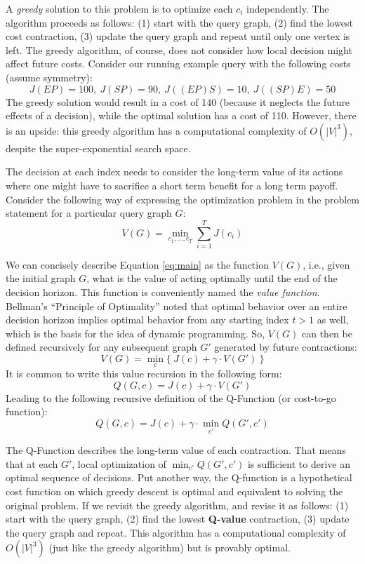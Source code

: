A \emph{greedy} solution to this problem is to optimize each $c_i$ independently. The algorithm proceeds as follows: (1) start with the query graph, (2) find the lowest cost contraction, (3) update the query graph and repeat until only one vertex is left. The greedy algorithm, of course, does not consider how local decision might affect future costs. Consider our running example query with the following costs (assume symmetry):
\[J(EP)= 100,~J(SP)= 90,~J((EP)S)= 10,~J((SP)E)= 50\]
The greedy solution would result in a cost of 140 (because it neglects the future effects of a decision), while the optimal solution has a cost of 110.
However, there is an upside: this greedy algorithm has a computational complexity of $O(|V|^3)$, despite the super-exponential search space.

The decision at each index needs to consider the long-term value of its actions where one might have to sacrifice a short term benefit for a long term payoff.
Consider the following way of expressing the optimization problem in the problem statement for a particular query graph $G$:
\begin{equation}
V(G) = \min_{c_1,...,c_T} \sum_{i=1}^T J(c_i)
\label{eq:main}
\end{equation}

We can concisely describe Equation \ref{eq:main} as the function $V(G)$,  i.e., given the initial graph $G$, what is the value of acting optimally until the end of the decision horizon. This function is conveniently named the \emph{value function}. Bellman's ``Principle of Optimality'' noted that optimal behavior over an entire decision horizon implies optimal behavior from any starting index $t>1$ as well, which is the basis for the idea of dynamic programming.
So, $V(G)$ can then be defined recursively for any subsequent graph $G'$ generated by future contractions:
\begin{equation}
V(G) = \min_{c}\{~J(c) + \gamma \cdot V(G') ~\}
\label{eq:value}
\end{equation}
It is common to write this value recursion in the following form:
\[
Q(G,c) = J(c) + \gamma \cdot V(G')
\]
Leading to the following recursive definition of the Q-Function (or cost-to-go function):
\begin{equation}
Q(G,c) = J(c) + \gamma \cdot \min_{c'} Q( G',c')
\label{eq:q}
\end{equation}

The Q-Function describes the long-term value of each contraction. 
That means that at each $G'$, local optimization of $\min_{c'} Q(G',c')$ is sufficient to derive an optimal sequence of decisions. Put another way, the Q-function is a hypothetical cost function on which greedy descent is optimal and equivalent to solving the original problem.
If we revisit the greedy algorithm, and revise it as follows: (1) start with the query graph, (2) find the lowest \textbf{Q-value} contraction, (3) update the query graph and repeat. This algorithm has a computational complexity of $O(|V|^3)$ (just like the greedy algorithm) but is provably optimal. 

